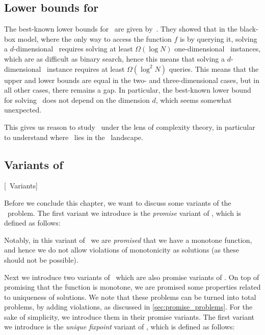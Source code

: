 \subsection{Lower bounds for \Tarski}

The best-known lower bounds for \Tarski\ are given by~. They showed that in the black-box model, where the only way to access the function $f$ is by querying it, solving a $d$-dimensional \Tarski\ requires solving at least $\Omega(\log{N})$ one-dimensional \Tarski\ instances, which are as difficult as binary search, hence this means that solving a $d$-dimensional \Tarski\ instance requires at least $\Omega(\log^{2}{N})$ queries. This means that the upper and lower bounds are equal in the two- and three-dimensional cases, but in all other cases, there remains a gap. In particular, the best-known lower bound for solving \Tarski\ does not depend on the dimension $d$, which seems somewhat unexpected.

This gives us reason to study \Tarski\ under the lens of complexity theory, in particular to understand where \Tarski\ lies in the \TFNP\ landscape.

\subsection{Variants of \Tarski}[\Tarski\ Variants]

Before we conclude this chapter, we want to discuss some variants of the \Tarski\ problem. The first variant we introduce is the \emph{promise} variant of \Tarski, which is defined as follows:


Notably, in this variant of \Tarski\ we are \emph{promised} that we have a monotone function, and hence we do not allow violations of monotonicity as solutions (as these should not be possible).

Next we introduce two variants of \Tarski\ which are also promise variants of \Tarski. On top of promising that the function is monotone, we are promised some properties related to uniqueness of solutions. We note that these problems can be turned into total problems, by adding violations, as discussed in \cref{sec:promise_problems}. For the sake of simplicity, we introduce them in their promise variants. The first variant we introduce is the \emph{unique fixpoint} variant of \Tarski, which is defined as follows:

